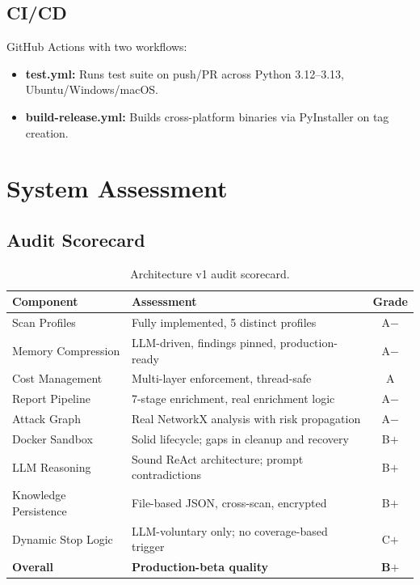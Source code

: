 \documentclass[12pt,a4paper]{report}
\begin{document}
\section{CI/CD}

GitHub Actions with two workflows:
\begin{itemize}
    \item \textbf{test.yml:} Runs test suite on push/PR across Python 3.12--3.13, Ubuntu/Windows/macOS.
    \item \textbf{build-release.yml:} Builds cross-platform binaries via PyInstaller on tag creation.
\end{itemize}


\chapter{System Assessment}

\section{Audit Scorecard}

\begin{table}[H]
\centering
\caption{Architecture v1 audit scorecard.}
\begin{tabular}{llc}
\toprule
\textbf{Component} & \textbf{Assessment} & \textbf{Grade} \\
\midrule
Scan Profiles          & Fully implemented, 5 distinct profiles            & A$-$ \\
Memory Compression     & LLM-driven, findings pinned, production-ready     & A$-$ \\
Cost Management        & Multi-layer enforcement, thread-safe               & A \\
Report Pipeline        & 7-stage enrichment, real enrichment logic          & A$-$ \\
Attack Graph           & Real NetworkX analysis with risk propagation       & A$-$ \\
Docker Sandbox         & Solid lifecycle; gaps in cleanup and recovery      & B$+$ \\
LLM Reasoning          & Sound ReAct architecture; prompt contradictions    & B$+$ \\
Knowledge Persistence  & File-based JSON, cross-scan, encrypted             & B$+$ \\
Dynamic Stop Logic     & LLM-voluntary only; no coverage-based trigger      & C$+$ \\
\midrule
\textbf{Overall}       & \textbf{Production-beta quality}                  & \textbf{B$+$} \\
\bottomrule
\end{tabular}
\end{table}
\end{document}

